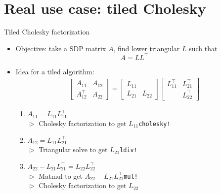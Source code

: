 \documentclass{beamer}
\begin{document}




\section{Real use case: tiled Cholesky}

\begin{frame}{Tiled Cholesky factorization}
  \begin{itemize}
  \item Objective: take a SDP matrix $A$, find lower triangular $L$ such
    that \[A=LL^\top\]
  \item Idea for a tiled algorithm:
    \begin{align*}
      \begin{bmatrix}
        A_{11} & A_{12} \\
        A_{12}^\top & A_{22}
      \end{bmatrix} = \begin{bmatrix}
        L_{11} & \\
        L_{21} & L_{22}
      \end{bmatrix}
                 \begin{bmatrix}
                   L^\top_{11} & L^\top_{21} \\
                   & L^\top_{22}
                 \end{bmatrix}
    \end{align*}
    \vspace{-10pt}
    \begin{enumerate}
    \item<2-> $A_{11} = L_{11} L^\top_{11}$\\
      $\vartriangleright$ Cholesky factorization to get $L_{11}$\hfill\texttt{cholesky!}\medskip
    \item<3-> $A_{12} = L_{11} L^\top_{21}$\\
      $\vartriangleright$ Triangular solve to get $L_{21}$\hfill\texttt{ldiv!}\medskip
    \item<4-> $A_{22} - L_{21} L^\top_{21} = L_{22} L^\top_{22}$\\
      $\vartriangleright$ Matmul to get $A_{22} - L_{21} L^\top_{21}$\hfill\texttt{mul!}\\
      $\vartriangleright$ Cholesky factorization to get $L_{22}$
    \end{enumerate}
  \end{itemize}
\end{frame}
\end{document}
